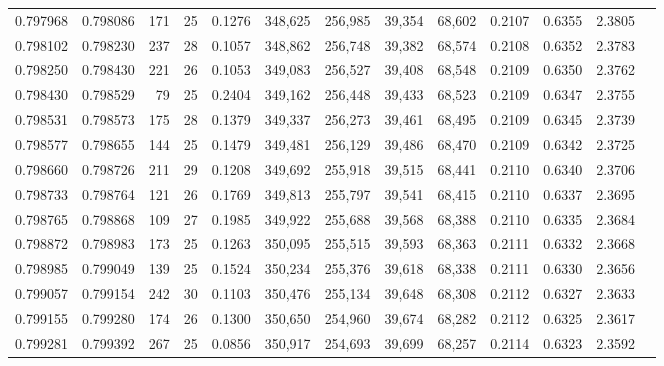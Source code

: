 \begin{tabular}{rrrrrrrrrrrrr}
0.797968 & 0.798086 &   171 &  25 &                                     0.1276 & 348,625 & 256,985 &  39,354 &  68,602 & 0.2107 & 0.6355 & 2.3805 \\
0.798102 & 0.798230 &   237 &  28 &                                     0.1057 & 348,862 & 256,748 &  39,382 &  68,574 & 0.2108 & 0.6352 & 2.3783 \\
0.798250 & 0.798430 &   221 &  26 &                                     0.1053 & 349,083 & 256,527 &  39,408 &  68,548 & 0.2109 & 0.6350 & 2.3762 \\
0.798430 & 0.798529 &    79 &  25 &                                     0.2404 & 349,162 & 256,448 &  39,433 &  68,523 & 0.2109 & 0.6347 & 2.3755 \\
0.798531 & 0.798573 &   175 &  28 &                                     0.1379 & 349,337 & 256,273 &  39,461 &  68,495 & 0.2109 & 0.6345 & 2.3739 \\
0.798577 & 0.798655 &   144 &  25 &                                     0.1479 & 349,481 & 256,129 &  39,486 &  68,470 & 0.2109 & 0.6342 & 2.3725 \\
0.798660 & 0.798726 &   211 &  29 &                                     0.1208 & 349,692 & 255,918 &  39,515 &  68,441 & 0.2110 & 0.6340 & 2.3706 \\
0.798733 & 0.798764 &   121 &  26 &                                     0.1769 & 349,813 & 255,797 &  39,541 &  68,415 & 0.2110 & 0.6337 & 2.3695 \\
0.798765 & 0.798868 &   109 &  27 &                                     0.1985 & 349,922 & 255,688 &  39,568 &  68,388 & 0.2110 & 0.6335 & 2.3684 \\
0.798872 & 0.798983 &   173 &  25 &                                     0.1263 & 350,095 & 255,515 &  39,593 &  68,363 & 0.2111 & 0.6332 & 2.3668 \\
0.798985 & 0.799049 &   139 &  25 &                                     0.1524 & 350,234 & 255,376 &  39,618 &  68,338 & 0.2111 & 0.6330 & 2.3656 \\
0.799057 & 0.799154 &   242 &  30 &                                     0.1103 & 350,476 & 255,134 &  39,648 &  68,308 & 0.2112 & 0.6327 & 2.3633 \\
0.799155 & 0.799280 &   174 &  26 &                                     0.1300 & 350,650 & 254,960 &  39,674 &  68,282 & 0.2112 & 0.6325 & 2.3617 \\
0.799281 & 0.799392 &   267 &  25 &                                     0.0856 & 350,917 & 254,693 &  39,699 &  68,257 & 0.2114 & 0.6323 & 2.3592 \\

\end{tabular}
